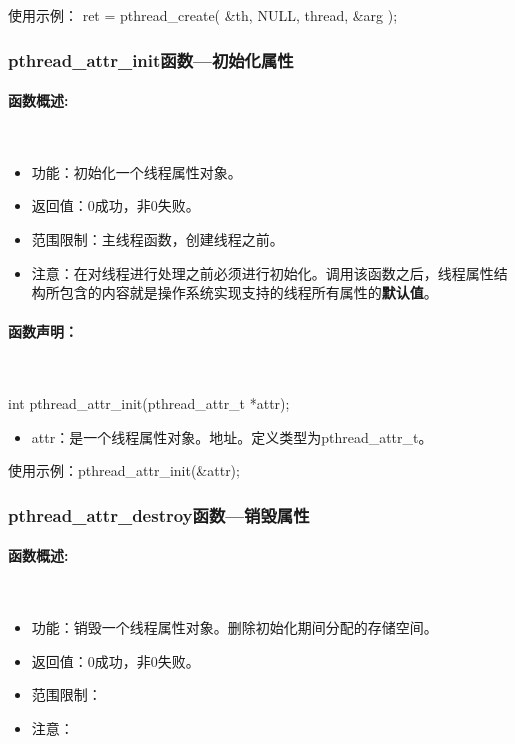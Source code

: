 \documentclass[UTF8]{article}%
\begin{document}
使用示例： ret = pthread\_create( \&th, NULL, thread, \&arg );  

\subsubsection{pthread\_attr\_init函数---初始化属性}

\paragraph{函数概述:}~{}

\begin{itemize}
    \item 功能：初始化一个线程属性对象。
    \item 返回值：0成功，非0失败。
    \item 范围限制：主线程函数，创建线程之前。
    \item 注意：在对线程进行处理之前必须进行初始化。调用该函数之后，线程属性结构所包含的内容就是操作系统实现支持的线程所有属性的\textbf{默认值}。
\end{itemize}

\paragraph{函数声明：}~{}

int pthread\_attr\_init(pthread\_attr\_t *attr);

\begin{itemize}
    \item attr：是一个线程属性对象。地址。定义类型为pthread\_attr\_t。
\end{itemize}

使用示例：pthread\_attr\_init(\&attr);

\subsubsection{pthread\_attr\_destroy函数---销毁属性}

\paragraph{函数概述:}~{}

\begin{itemize}
    \item 功能：销毁一个线程属性对象。删除初始化期间分配的存储空间。
    \item 返回值：0成功，非0失败。
    \item 范围限制：
    \item 注意：
\end{itemize}
\end{document}

